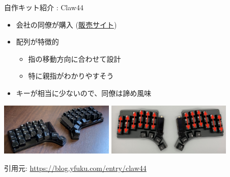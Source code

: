 \documentclass[cjk,dvipdfmx,10pt,compress,fragile%
hyperref={bookmarks=true,bookmarksnumbered=true,bookmarksopen=false,%
colorlinks=false,%
pdftitle={第 134 回 関西 Debian 勉強会},%
pdfauthor={小林},%
pdfsubject={資料},%
}]{beamer}
\begin{document}
\begin{frame}[fragile,t]{自作キット紹介 : Claw44}
 \begin{itemize}
  \item 会社の同僚が購入 (\href{https://yushakobo.jp/shop/consign_claw44/}{販売サイト})
  \item 配列が特徴的
	\begin{itemize}
	 \item 指の移動方向に合わせて設計
	 \item 特に親指がわかりやすそう
	\end{itemize}
  \item キーが相当に少ないので、同僚は諦め風味
 \end{itemize}
 \begin{center}
  \includegraphics[keepaspectratio,height=2.5cm]{./img/claw44-01.jpg}
  \hspace*{1zw}
  \includegraphics[keepaspectratio,height=2.5cm]{./img/claw44-02.jpg}
 \end{center}
 \vspace*{-1zw}
 \begin{flushright}
  {\footnotesize 引用元: \url{https://blog.yfuku.com/entry/claw44}}
 \end{flushright}
\end{frame}
\end{document}

